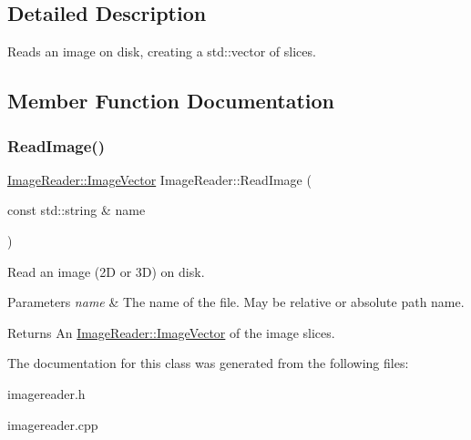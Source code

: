 \subsection{Detailed Description}
Reads an image on disk, creating a std\+::vector of slices. 

\subsection{Member Function Documentation}
\mbox{\label{class_image_reader_a58ff32562a6c769c57f4be1bcdf6ca4d}} 
\subsubsection{\texorpdfstring{Read\+Image()}{ReadImage()}}
{\footnotesize\ttfamily \hyperlink{class_image_reader_abc7391a4bfa9f600de693649c105ee1f}{Image\+Reader\+::\+Image\+Vector} Image\+Reader\+::\+Read\+Image (\begin{DoxyParamCaption}\item[{const std\+::string \&}]{name }\end{DoxyParamCaption})}



Read an image (2D or 3D) on disk. 


\begin{DoxyParams}{Parameters}
{\em name} & The name of the file. May be relative or absolute path name. \\
\hline
\end{DoxyParams}
\begin{DoxyReturn}{Returns}
An \hyperlink{class_image_reader_abc7391a4bfa9f600de693649c105ee1f}{Image\+Reader\+::\+Image\+Vector} of the image slices. 
\end{DoxyReturn}


The documentation for this class was generated from the following files\+:\begin{DoxyCompactItemize}
\item 
imagereader.\+h\item 
imagereader.\+cpp\end{DoxyCompactItemize}
